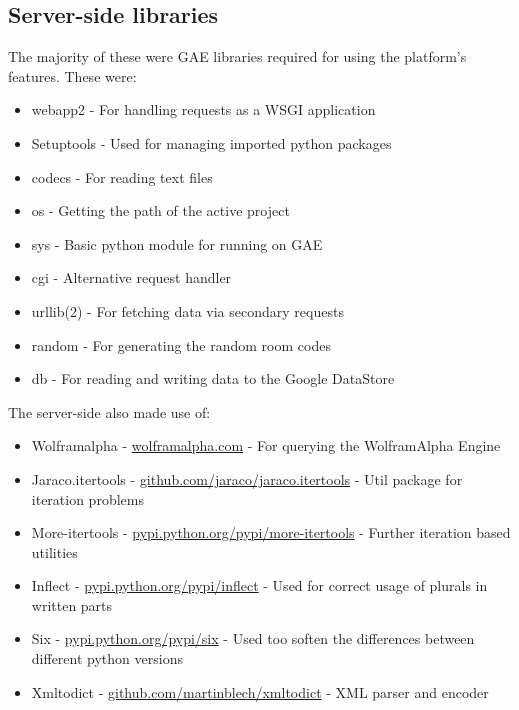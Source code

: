 \subsection{Server-side libraries}
The majority of these were GAE libraries required for using the platform's features. These were:
\begin{itemize}
   \item webapp2 - For handling requests as a WSGI application
   \item Setuptools - Used for managing imported python packages
   \item codecs - For reading text files
   \item os - Getting the path of the active project
   \item sys - Basic python module for running on GAE
   \item cgi - Alternative request handler
   \item urllib(2) - For fetching data via secondary requests
   \item random - For generating the random room codes
   \item db - For reading and writing data to the Google DataStore
\end{itemize}
The server-side also made use of:
\begin{itemize}
   \item Wolframalpha - \url{wolframalpha.com} - For querying the WolframAlpha Engine
   \item Jaraco.itertools - \url{github.com/jaraco/jaraco.itertools} - Util package for iteration problems
   \item More-itertools - \url{pypi.python.org/pypi/more-itertools} - Further iteration based utilities
   \item Inflect - \url{pypi.python.org/pypi/inflect} - Used for correct usage of plurals in written parts
   \item Six - \url{pypi.python.org/pypi/six} - Used too soften the differences between different python versions
   \item Xmltodict - \url{github.com/martinblech/xmltodict} - XML parser and encoder
\end{itemize}
